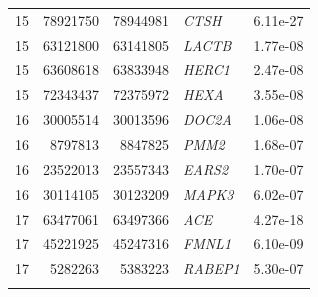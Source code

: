 \begin{longtable}{rrrlr}
   15 & 78921750 & 78944981 & \textit{CTSH} & 6.11e-27 \\ 
   15 & 63121800 & 63141805 & \textit{LACTB} & 1.77e-08 \\ 
   15 & 63608618 & 63833948 & \textit{HERC1} & 2.47e-08 \\ 
   15 & 72343437 & 72375972 & \textit{HEXA} & 3.55e-08 \\ 
   16 & 30005514 & 30013596 & \textit{DOC2A} & 1.06e-08 \\ 
   16 & 8797813 & 8847825 & \textit{PMM2} & 1.68e-07 \\ 
   16 & 23522013 & 23557343 & \textit{EARS2} & 1.70e-07 \\ 
   16 & 30114105 & 30123209 & \textit{MAPK3} & 6.02e-07 \\ 
   17 & 63477061 & 63497366 & \textit{ACE} & 4.27e-18 \\ 
   17 & 45221925 & 45247316 & \textit{FMNL1} & 6.10e-09 \\ 
   17 & 5282263 & 5383223 & \textit{RABEP1} & 5.30e-07 \\ 
   \bottomrule
\label{tab:cis/trans-PWAS_riskgenes}
\end{longtable}
\pagebreak

